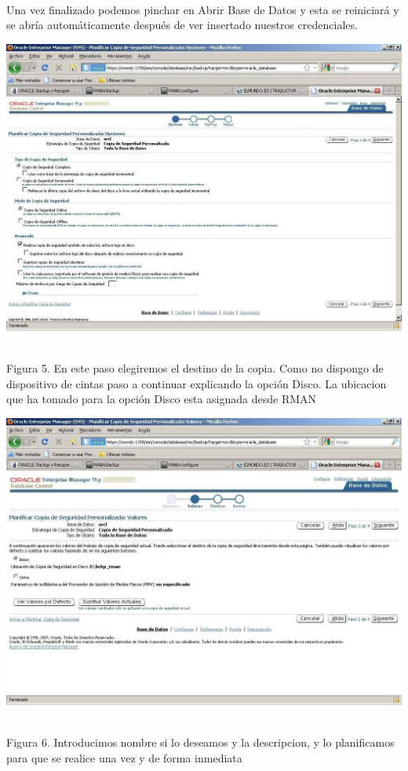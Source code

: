 \begin{enumerate}[1.]
	\\Una vez finalizado podemos pinchar en Abrir Base de Datos y esta se reiniciará y se abría automáticamente después de ver insertado nuestros credenciales.
	\begin{center}
	\includegraphics[width=15cm]{./Imagenes/eje1}
	\end{center}	
	\\Figura 5. En este paso elegiremos el destino de la copia. Como no dispongo de dispositivo de cintas paso a continuar explicando la opción Disco. La ubicacion que ha tomado para la opción  Disco  esta asignada desde RMAN
	\begin{center}
	\includegraphics[width=15cm]{./Imagenes/eje2}
	\end{center}
	\\Figura 6. Introducimos nombre si lo deseamos y la descripcion, y lo planificamos para que se realice una vez y de forma inmediata

\end{enumerate}
